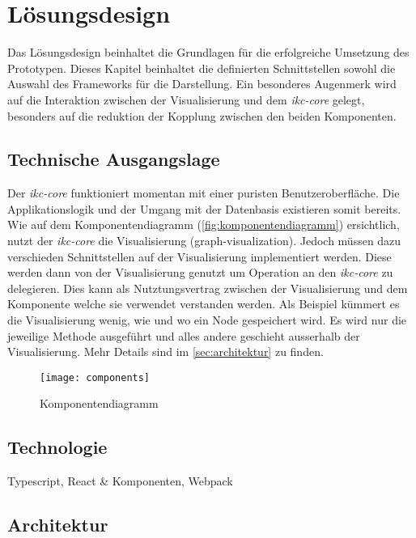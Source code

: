 \chapter{Lösungsdesign}

Das Lösungsdesign beinhaltet die Grundlagen für die erfolgreiche Umsetzung des Prototypen. Dieses Kapitel beinhaltet die definierten Schnittstellen sowohl die Auswahl des Frameworks für die Darstellung. Ein besonderes Augenmerk wird auf die Interaktion zwischen der Visualisierung und dem \textit{ikc-core} gelegt, besonders auf die reduktion der Kopplung zwischen den beiden Komponenten. 

\section{Technische Ausgangslage}
Der \textit{ikc-core} funktioniert momentan mit einer puristen Benutzeroberfläche. Die Applikationslogik und der Umgang mit der Datenbasis existieren somit  bereits. Wie auf dem Komponentendiagramm (\autoref{fig:komponentendiagramm}) ersichtlich, nutzt der \textit{ikc-core} die Visualisierung (graph-visualization). Jedoch müssen dazu verschieden Schnittstellen auf der Visualisierung implementiert werden. Diese werden dann von der Visualisierung genutzt um Operation an den \textit{ikc-core} zu delegieren. Dies kann als Nutztungsvertrag zwischen der Visualisierung und dem Komponente welche sie verwendet verstanden werden. Als Beispiel kümmert es die Visualisierung wenig, wie und wo ein Node gespeichert wird. Es wird nur die jeweilige Methode ausgeführt und alles andere geschieht ausserhalb der Visualisierung. Mehr Details sind im \autoref{sec:architektur} zu finden.

\begin{figure}[H]
\centering
\texttt{[image: components]}
\caption{Komponentendiagramm}
\label{fig:komponentendiagramm}
\end{figure}


\section{Technologie}
\label{sec:technologie}
Typescript, React \& Komponenten, Webpack

\section{Architektur}
\label{sec:architektur}

